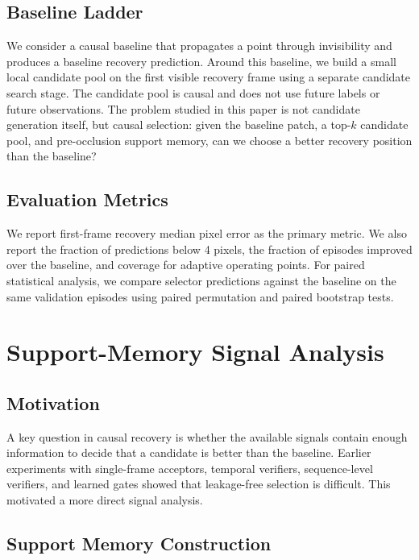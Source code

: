 \documentclass[10pt,journal,compsoc]{IEEEtran}
\begin{document}
\subsection{Baseline Ladder}

We consider a causal baseline that propagates a point through invisibility and produces a baseline recovery prediction. Around this baseline, we build a small local candidate pool on the first visible recovery frame using a separate candidate search stage. The candidate pool is causal and does not use future labels or future observations. The problem studied in this paper is not candidate generation itself, but causal selection: given the baseline patch, a top-$k$ candidate pool, and pre-occlusion support memory, can we choose a better recovery position than the baseline?

\subsection{Evaluation Metrics}

We report first-frame recovery median pixel error as the primary metric. We also report the fraction of predictions below 4 pixels, the fraction of episodes improved over the baseline, and coverage for adaptive operating points. For paired statistical analysis, we compare selector predictions against the baseline on the same validation episodes using paired permutation and paired bootstrap tests.

\section{Support-Memory Signal Analysis}
\label{sec:analysis}

\subsection{Motivation}

A key question in causal recovery is whether the available signals contain enough information to decide that a candidate is better than the baseline. Earlier experiments with single-frame acceptors, temporal verifiers, sequence-level verifiers, and learned gates showed that leakage-free selection is difficult. This motivated a more direct signal analysis.

\subsection{Support Memory Construction}
\end{document}
